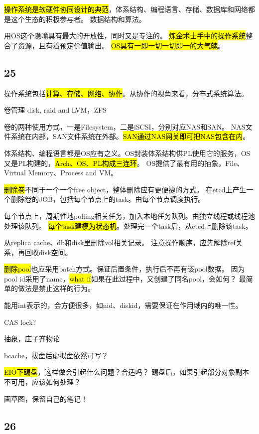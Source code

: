 \hl{操作系统是软硬件协同设计的典范}，体系结构、编程语言、存储、数据库和网络都是这个生态的积极参与者。
数据结构和算法。

用OS这个隐喻具有最大的开放性，同时又是专注的。
\hl{炼金术士手中的操作系统}整合了资源，且有着预定价值输出。
\hl{OS具有一即一切一切即一的大气魄}。

\subsection{25}

操作系统包括\hl{计算、存储、网络、协作}。从协作的视角来看，分布式系统算法。

卷管理 disk, raid and LVM，ZFS

卷的两种使用方式，一是Filesystem，二是iSCSI，分别对应NAS和SAN。
NAS文件系统在内部，SAN文件系统在外部。\hl{SAN通过NAS网关即可把NAS包含在内}。

体系结构、编程语言都是OS应有之义。OS封装体系结构供PL使用它的服务，OS又是PL构建的，\hl{Arch、OS、PL构成三连环}。
OS提供了最有用的抽象，File、Virtual Memory、Process and VM。

\hrulefill

\hl{删除卷}不同于一个一个free object，整体删除应有更便捷的方式。
在etcd上产生一个删除卷的JOB，包括每个节点上的task。由每个节点调度执行。

每个节点上，周期性地polling相关任务，加入本地任务队列。由独立线程或线程池处理该队列。
\hl{每个task建模为状态机}。处理完一个task后，从etcd上删除该task。

从replica cache、db和disk里删除vol相关记录。
注意操作顺序，应先解除ref关系，再回收disk空间。

\hl{删除pool}也应采用batch方式。保证后置条件，执行后不再有该pool数据。
因为pool id采用了name，\hl{what if}如果在此过程中，又创建了同名pool，会如何？
最简单的做法是禁止这样的行为。

\hrulefill

能用int表示的，会方便很多，如nid、diskid，需要保证在作用域内的唯一性。

CAS lock?

抽象，庄子齐物论

\hrulefill

bcache，拔盘后虚拟盘依然可写？

\hl{EIO下踢盘}，这样做会引起什么问题？合适吗？
踢盘后，如果引起部分对象副本不可用，应该如何处理？

画草图，保留自己的笔记！

\subsection{26}

